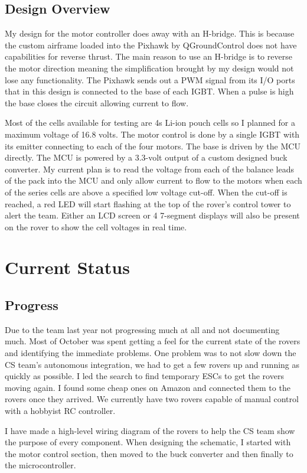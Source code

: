 \documentclass[conference]{IEEEtran}
\begin{document}
\subsection{Design Overview}

My design for the motor controller does away with an H-bridge. This is because the custom airframe loaded into the Pixhawk by QGroundControl does not have capabilities for reverse thrust. The main reason to use an H-bridge is to reverse the motor direction meaning the simplification brought by my design would not lose any functionality. The Pixhawk sends out a PWM signal from its I/O ports that in this design is connected to the base of each IGBT. When a pulse is high the base closes the circuit allowing current to flow.
\par Most of the cells available for testing are 4s Li-ion pouch cells so I planned for a maximum voltage of 16.8 volts. The motor control is done by a single IGBT with its emitter connecting to each of the four motors. The base is driven by the MCU directly. The MCU is powered by a 3.3-volt output of a custom designed buck converter. My current plan is to read the voltage from each of the balance leads of the pack into the MCU and only allow current to flow to the motors when each of the series cells are above a specified low voltage cut-off. When the cut-off is reached, a red LED will start flashing at the top of the rover's control tower to alert the team. Either an LCD screen or 4 7-segment displays will also be present on the rover to show the cell voltages in real time.

\section{Current Status}

\subsection{Progress}

Due to the team last year not progressing much at all and not documenting much. Most of October was spent getting a feel for the current state of the rovers and identifying the immediate problems. One problem was to not slow down the CS team's autonomous integration, we had to get a few rovers up and running as quickly as possible. I led the search to find temporary ESCs to get the rovers moving again. I found some cheap ones on Amazon and connected them to the rovers once they arrived. We currently have two rovers capable of manual control with a hobbyist RC controller.
\par I have made a high-level wiring diagram of the rovers to help the CS team show the purpose of every component. When designing the schematic, I started with the motor control section, then moved to the buck converter and then finally to the microcontroller.
\end{document}
